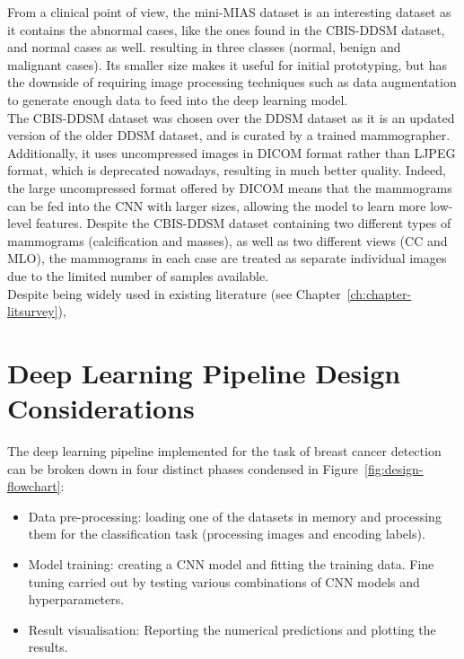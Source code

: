 From a clinical point of view, the mini-MIAS dataset is an interesting dataset as it contains the abnormal cases, like the ones found in the CBIS-DDSM dataset, and normal cases as well. resulting in three classes (normal, benign and malignant cases). Its smaller size makes it useful for initial prototyping, but has the downside of requiring image processing techniques such as data augmentation to generate enough data to feed into the deep learning model.\\

The CBIS-DDSM dataset was chosen over the DDSM dataset as it is an updated version of the older DDSM dataset, and is curated by a trained mammographer. Additionally, it uses uncompressed images in DICOM format rather than LJPEG format, which is deprecated nowadays, resulting in much better quality. Indeed, the large uncompressed format offered by DICOM means that the mammograms can be fed into the CNN with larger sizes, allowing the model to learn more low-level features. Despite the CBIS-DDSM dataset containing two different types of mammograms (calcification and masses), as well as two different views (CC and MLO), the mammograms in each case are treated as separate individual images due to the limited number of samples available.\\

Despite being widely used in existing literature (see Chapter~\ref{ch:chapter-litsurvey}), 


\section{Deep Learning Pipeline Design Considerations}

The deep learning pipeline implemented for the task of breast cancer detection can be broken down in four distinct phases condensed in Figure~\ref{fig:design-flowchart}:

\begin{itemize}
    \item Data pre-processing: loading one of the datasets in memory and processing them for the classification task (processing images and encoding labels).
    \item Model training: creating a CNN model and fitting the training data. Fine tuning carried out by testing various combinations of CNN models and hyperparameters.
    \item Result visualisation: Reporting the numerical predictions and plotting the results.
    \end{itemize}

